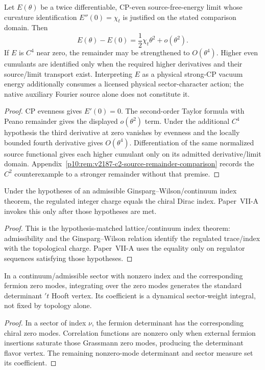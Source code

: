 \documentclass[12pt,a4paper]{article}
\begin{document}
\begin{corollary}
\label{p10:cor:native-full-qcd-theta-shape}
Let $E(\theta)$ be a twice differentiable, CP-even source-free-energy limit
whose curvature identification $E''(0)=\chi_t$ is justified on the stated
comparison domain.  Then
\begin{equation}
E(\theta)-E(0)=\frac12\chi_t\theta^2+o(\theta^2).
\end{equation}
If $E$ is $C^4$ near zero, the remainder may be strengthened to
$O(\theta^4)$.  Higher even cumulants are identified only when the required
higher derivatives and their source/limit transport exist.  Interpreting
$E$ as a physical strong-CP vacuum energy additionally consumes a licensed
physical sector-character action; the native auxiliary Fourier source alone
does not constitute it.
\end{corollary}
\begin{proof}
CP evenness gives $E'(0)=0$.  The second-order Taylor formula with Peano
remainder gives the displayed $o(\theta^2)$ term.  Under the additional $C^4$
hypothesis the third derivative at zero vanishes by evenness and the locally
bounded fourth derivative gives $O(\theta^4)$.  Differentiation of the same
normalized source functional gives each higher cumulant only on its admitted
derivative/limit domain.  Appendix~\ref{p10:rem:v2187-c2-source-remainder-comparison}
records the $C^2$ counterexample to a stronger remainder without that premise.
\end{proof}

\begin{theorem}
\label{p10:thm:topological-index-bridge}
Under the hypotheses of an admissible Ginsparg--Wilson/continuum index theorem, the regulated integer charge equals the chiral Dirac index.  Paper~VII-A invokes this only after those hypotheses are met.
\end{theorem}
\begin{proof}
This is the hypothesis-matched lattice/continuum index theorem: admissibility and the Ginsparg--Wilson relation identify the regulated trace/index with the topological charge.  Paper~VII-A uses the equality only on regulator sequences satisfying those hypotheses.
\end{proof}

\begin{theorem}
\label{p10:thm:topology-induced-thooft-interaction}
In a continuum/admissible sector with nonzero index and the corresponding fermion zero modes, integrating over the zero modes generates the standard determinant \('t\) Hooft vertex.  Its coefficient is a dynamical sector-weight integral, not fixed by topology alone.
\end{theorem}
\begin{proof}
In a sector of index $\nu$, the fermion determinant has the corresponding chiral zero modes.  Correlation functions are nonzero only when external fermion insertions saturate those Grassmann zero modes, producing the determinant flavor vertex.  The remaining nonzero-mode determinant and sector measure set its coefficient.
\end{proof}
\end{document}

